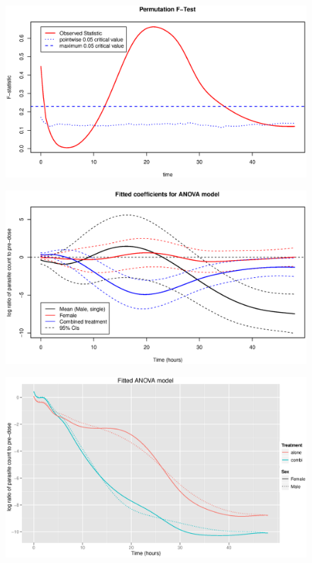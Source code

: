\begin{figure}[h]
\includegraphics[width=150mm]{fdapermF.eps} 
\caption{}
\label{fdapermF}
\end{figure}
\begin{figure}[h]
\includegraphics[width=150mm]{fdcoef.eps} 
\caption{}
\label{fdcoef}
\end{figure}
\begin{figure}[h]
\includegraphics[width=150mm]{fdfitted.eps} 
\caption{}
\label{fdfitted}
\end{figure}

